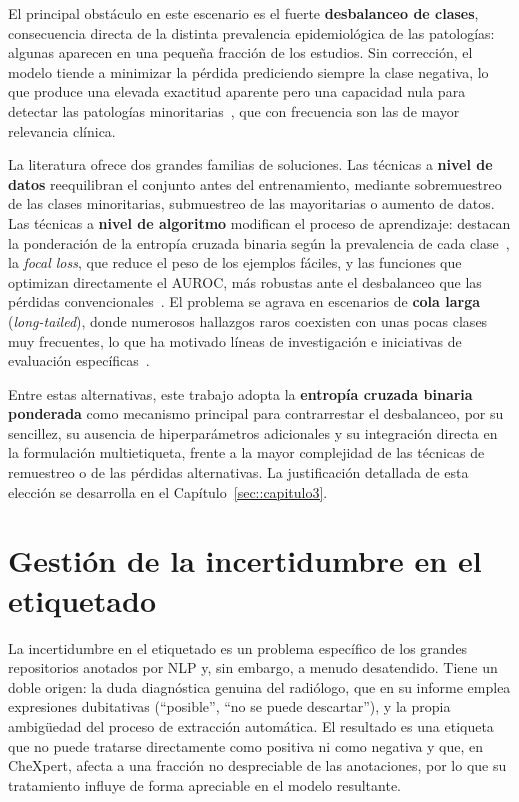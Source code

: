 El principal obstáculo en este escenario es el fuerte \textbf{desbalanceo de
clases}, consecuencia directa de la distinta prevalencia epidemiológica de las
patologías: algunas aparecen en una pequeña fracción de los estudios. Sin
corrección, el modelo tiende a minimizar la pérdida prediciendo siempre la clase
negativa, lo que produce una elevada exactitud aparente pero una capacidad nula
para detectar las patologías minoritarias~\cite{lizDeepLearningMultilabel2023},
que con frecuencia son las de mayor relevancia clínica.

La literatura ofrece dos grandes familias de soluciones. Las técnicas a
\textbf{nivel de datos} reequilibran el conjunto antes del entrenamiento, mediante
sobremuestreo de las clases minoritarias, submuestreo de las mayoritarias o
aumento de datos. Las técnicas a \textbf{nivel de algoritmo} modifican el proceso
de aprendizaje: destacan la ponderación de la entropía cruzada binaria según la
prevalencia de cada clase~\cite{usharubyBinaryCrossEntropy2020}, la \textit{focal
loss}, que reduce el peso de los ejemplos fáciles, y las funciones que optimizan
directamente el AUROC, más robustas ante el desbalanceo que las pérdidas
convencionales~\cite{yuanLargeScaleRobustDeepAUC2021}. El problema se agrava en
escenarios de \textbf{cola larga} (\textit{long-tailed}), donde numerosos
hallazgos raros coexisten con unas pocas clases muy frecuentes, lo que ha
motivado líneas de investigación e iniciativas de evaluación
específicas~\cite{holsteCXRLT2024}.

Entre estas alternativas, este trabajo adopta la \textbf{entropía cruzada binaria
ponderada} como mecanismo principal para contrarrestar el desbalanceo, por su
sencillez, su ausencia de hiperparámetros adicionales y su integración directa en
la formulación multietiqueta, frente a la mayor complejidad de las técnicas de
remuestreo o de las pérdidas alternativas. La justificación detallada de esta
elección se desarrolla en el Capítulo~\ref{sec::capitulo3}.


\section{Gestión de la incertidumbre en el etiquetado}
\label{sec::ec_incertidumbre}

La incertidumbre en el etiquetado es un problema específico de los grandes
repositorios anotados por NLP y, sin embargo, a menudo desatendido. Tiene un doble
origen: la duda diagnóstica genuina del radiólogo, que en su informe emplea
expresiones dubitativas (``posible'', ``no se puede descartar''), y la propia
ambigüedad del proceso de extracción automática. El resultado es una etiqueta que
no puede tratarse directamente como positiva ni como negativa y que, en CheXpert,
afecta a una fracción no despreciable de las anotaciones, por lo que su
tratamiento influye de forma apreciable en el modelo resultante.

